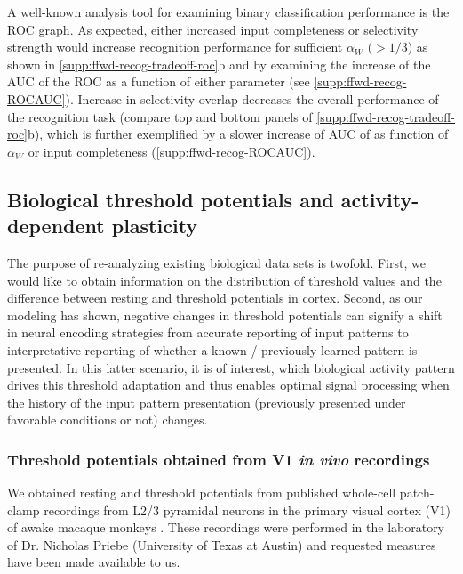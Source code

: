 A well-known analysis tool for examining binary classification performance is the ROC graph.
    As expected, either increased input completeness or selectivity strength would increase recognition performance
        for sufficient $\alpha_W$ ($ > 1/3$) as shown in \autoref{supp:ffwd-recog-tradeoff-roc}b
        and by examining the increase of the AUC of the ROC as a function of either parameter
        (see \autoref{supp:ffwd-recog-ROCAUC}).
    Increase in selectivity overlap decreases the overall performance of the recognition task
        (compare top and bottom panels of \autoref{supp:ffwd-recog-tradeoff-roc}b),
        which is further exemplified by
        a slower increase of AUC of as function of $\alpha_W$
        or input completeness (\autoref{supp:ffwd-recog-ROCAUC}).

\subsection{Biological threshold potentials and activity-dependent plasticity}

The purpose of re-analyzing existing biological data sets is twofold.
    First, we would like to obtain information on the distribution of threshold values
        and the difference between resting and threshold potentials in cortex.
    Second, as our modeling has shown, negative changes in threshold potentials
        can signify a shift in neural encoding strategies
        from accurate reporting of input patterns
        to interpretative reporting of whether a known / previously learned pattern is presented.
    In this latter scenario, it is of interest,
        which biological activity pattern drives this threshold adaptation
        and thus enables optimal signal processing
        when the history of the input pattern presentation (previously presented under favorable conditions or not) changes.

\subsubsection*{Threshold potentials obtained from V1 \textit{in vivo} recordings}

We obtained resting and threshold potentials
        from published whole-cell patch-clamp recordings
        from L2/3 pyramidal neurons in the primary visual cortex (V1)
        of awake macaque monkeys \citep{Li2020-ej}.
    These recordings were performed
        in the laboratory of Dr. Nicholas Priebe (University of Texas at Austin)
        and requested measures have been made available to us.

